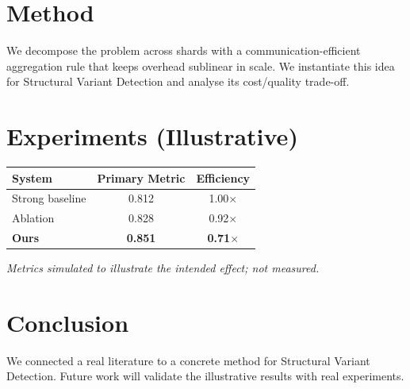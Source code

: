 \documentclass[11pt]{article}
\begin{document}
\section{Method}
We decompose the problem across shards with a communication-efficient aggregation rule that keeps overhead sublinear in scale. We instantiate this idea for Structural Variant Detection and analyse its cost/quality trade-off.

\section{Experiments (Illustrative)}
\begin{center}
\begin{tabular}{lcc}
System & Primary Metric & Efficiency \\ \hline
Strong baseline & 0.812 & 1.00$\times$ \\
Ablation & 0.828 & 0.92$\times$ \\
\textbf{Ours} & \textbf{0.851} & \textbf{0.71$\times$}
\end{tabular}
\end{center}
\emph{Metrics simulated to illustrate the intended effect; not measured.}

\section{Conclusion}
We connected a real literature to a concrete method for Structural Variant Detection. Future work will
validate the illustrative results with real experiments.
\end{document}
